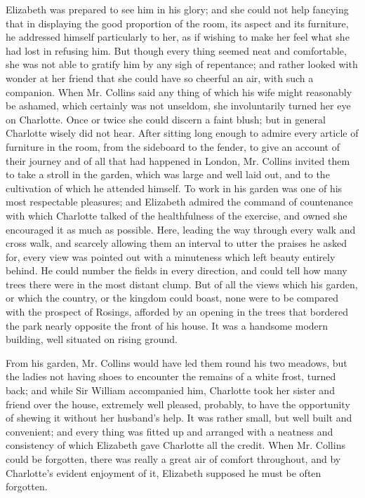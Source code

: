 Elizabeth was prepared to see him in his glory; and
she could not help fancying that in displaying the good
proportion of the room, its aspect and its furniture, he
addressed himself particularly to her, as if wishing to
make her feel what she had lost in refusing him. But
though every thing seemed neat and comfortable, she
was not able to gratify him by any sigh of repentance;
and rather looked with wonder at her friend that she
could have so cheerful an air, with such a companion.
When Mr. Collins said any thing of which his wife might
reasonably be ashamed, which certainly was not unseldom,
she involuntarily turned her eye on Charlotte. Once or
twice she could discern a faint blush; but in general
Charlotte wisely did not hear. After sitting long enough
to admire every article of furniture in the room, from the
sideboard to the fender, to give an account of their journey
and of all that had happened in London, Mr. Collins
invited them to take a stroll in the garden, which was large
and well laid out, and to the cultivation of which he
attended himself. To work in his garden was one of his
most respectable pleasures; and Elizabeth admired the
command of countenance with which Charlotte talked of
the healthfulness of the exercise, and owned she encouraged
it as much as possible. Here, leading the way through
every walk and cross walk, and scarcely allowing them an
interval to utter the praises he asked for, every view was
pointed out with a minuteness which left beauty entirely
behind. He could number the fields in every direction,
and could tell how many trees there were in the most
distant clump. But of all the views which his garden,
or which the country, or the kingdom could boast, none
were to be compared with the prospect of Rosings, afforded
by an opening in the trees that bordered the park nearly
opposite the front of his house. It was a handsome
modern building, well situated on rising ground.

From his garden, Mr. Collins would have led them round
his two meadows, but the ladies not having shoes to
encounter the remains of a white frost, turned back; and
while Sir William accompanied him, Charlotte took her
sister and friend over the house, extremely well pleased,
probably, to have the opportunity of shewing it without
her husband’s help. It was rather small, but well built
and convenient; and every thing was fitted up and
arranged with a neatness and consistency of which Elizabeth
gave Charlotte all the credit. When Mr. Collins
could be forgotten, there was really a great air of comfort
throughout, and by Charlotte’s evident enjoyment of it,
Elizabeth supposed he must be often forgotten.

